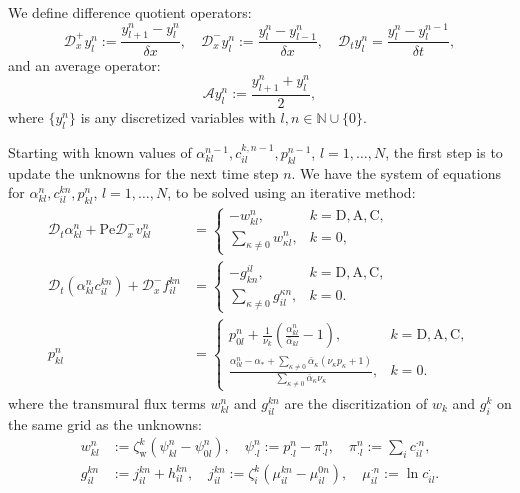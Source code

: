 \documentclass{article}
\begin{document}
We define difference quotient operators:
\begin{equation}
    \mathcal{D}_x^+y^n_l:= \frac{y^n_{l+1}-y^n_{l}}{\delta x},\quad \mathcal{D}_x^- y^n_l :=\frac{y^n_l-y^n_{l-1}}{\delta x},\quad \mathcal{D}_t y^n_l = \frac{y^n_l - y^{n-1}_l}{\delta t},
\end{equation}
and an average operator:
\begin{equation}
    \mathcal{A} y_l^n := \frac{y^n_{l+1}+y^n_l}{2},
\end{equation}
    where $\{y_l^n\}$ is any discretized variables with $l,n\in \mathbb{N}\cup\{0\}$.

Starting with known values of $\alpha^{n-1}_{kl},c_{il}^{k,n-1}, p_{kl}^{n-1}$, $l = 1,\dots,N$, the first step is to update the unknowns for the next time step $n$.
We have the system of equations for $\alpha^{n}_{kl},c_{il}^{kn}, p_{kl}^{n}$, $l=1,\dots,N$, to be solved using an iterative method:
\begin{align}
    \mathcal{D}_t \alpha_{kl}^n +\mathrm{Pe}\mathcal{D}_x^-v_{kl}^n &= \begin{cases}
        -w_{kl}^{n},\quad &k=\mathrm{D},\mathrm{A},\mathrm{C},\\
        \sum_{\kappa\neq 0} w_{\kappa l}^n, &k=0,
    \end{cases}\\
    \mathcal{D}_t (\alpha_{kl}^nc_{il}^{kn})+\mathcal{D}_x^-f_{il}^{kn}&=\begin{cases}
        -g_{k n}^{il}, &k=\mathrm{D},\mathrm{A},\mathrm{C},\\
        \sum_{\kappa \neq 0}g_{il}^{\kappa n}, &k=0.
    \end{cases}\\
    p_{kl}^n &= \begin{cases}
        p_{0l}^n + \frac{1}{\nu_k}\left( \frac{\alpha_{kl}^n}{\bar{\alpha}_{kl}} - 1\right),\quad &k=\mathrm{D},\mathrm{A},\mathrm{C},\\
        \frac{\alpha_{0l}^n - \alpha_* + \sum_{\kappa\neq 0}\bar{\alpha}_\kappa (\nu_\kappa p_\kappa +1)}{\sum_{\kappa\neq 0}\bar{\alpha}_\kappa \nu_\kappa }, &k=0.
    \end{cases}
\end{align}
where the transmural flux terms $w_{kl}^n$ and $g_{il}^{kn}$ are the discritization of $w_k$ and $g_i^k$ on the same grid as the unknowns:
\begin{align}
    w_{kl}^n &:=\zeta_\mathrm{w}^k\left( \psi_{kl}^n-\psi_{0l}^n \right),\quad
    \psi_{\cdot l}^n:= p_{\cdot l}^n - \pi_{\cdot l}^n,\quad \pi_{\cdot l}^n:= \sum_i c_{il}^{\cdot n},\\
    g_{il}^{kn}&:= j_{il}^{kn}+h_{il}^{kn},\quad j_{il}^{kn}:=\zeta_i^k\left( \mu_{il}^{kn} - \mu_{il}^{0n} \right),\quad \mu_{il}^{\cdot n}:= \ln c_{il}^{\cdot}.
\end{align}
\end{document}
